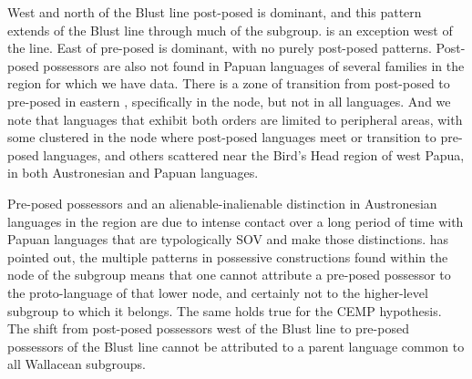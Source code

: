 West and north of the Blust line post-posed is dominant,
and this pattern extends  of the Blust line through much
of the  subgroup.
 is an exception west of the line.
East of  pre-posed is dominant,
with no purely post-posed patterns.
Post-posed possessors are also not found in Papuan languages
of several families in the region for which we have data.
There is a zone of transition from post-posed to pre-posed in
eastern , specifically in the  node,
but not in all languages.
And we note that languages that exhibit both orders are limited
to peripheral areas, with some clustered in the 
node where post-posed
languages meet or transition to pre-posed languages,
and others scattered near the Bird’s Head region of west Papua,
in both Austronesian and Papuan languages.

Pre-posed possessors and an alienable-inalienable distinction
in Austronesian languages in the region are due to intense contact
over a long period of time with Papuan languages that are typologically
SOV and make those distinctions.
 \citet{Fricke2019} has pointed out,
the multiple patterns in possessive constructions found within
the  node of the  subgroup
means that one cannot attribute a pre-posed possessor to the
proto-language of that lower node,
and certainly not to the higher-level subgroup to which it belongs.
The same holds true for the CEMP hypothesis.
The shift from post-posed possessors west of the Blust line to
pre-posed possessors  of the Blust line cannot be attributed
to a parent language common to all Wallacean subgroups.